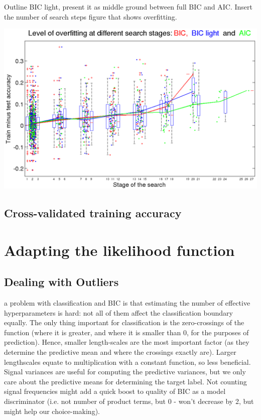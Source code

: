 \documentclass[a4paper,12pt ]{report}
\begin{document}
Outline BIC light, present it as middle ground between full BIC and AIC. 
Insert the number of search steps figure that shows overfitting. 


\includegraphics[scale=0.37]{figures/measureoverfit.png}

\subsection{Cross-validated training accuracy}




\section{Adapting the likelihood function}

\subsection{Dealing with Outliers}

a problem with classification and BIC is that estimating the number of effective hyperparameters is hard: not all of them affect the classification boundary equally. The only thing important for classification is the zero-crossings of the function (where it is greater, and where it is smaller than 0, for the purposes of prediction). Hence, smaller length-scales are the most important factor (as they determine the predictive mean and where the crossings exactly are). Larger lengthscales equate to multiplication with a constant function, so less beneficial. Signal variances are useful for computing the predictive variances, but we only care about the predictive means for determining the target label. Not counting signal frequencies might add a quick boost to quality of BIC as a model discriminator (i.e. not number of product terms, but 0 - won’t decrease by 2, but might help our choice-making). 
\end{document}
